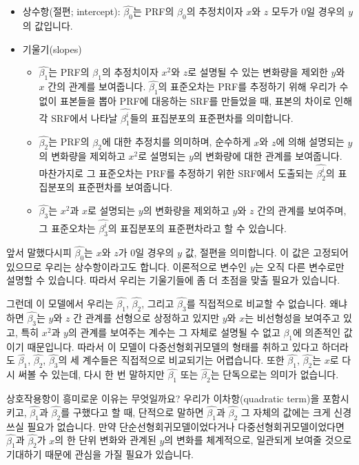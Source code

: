 \documentclass[
]{book}
\begin{document}
\begin{itemize}
\item
  상수항(절편; intercept): \(\hat{\beta_0}\)는 PRF의 \(\beta_0\)의 추정치이자 \(x\)와 \(z\) 모두가 0일 경우의 \(y\)의 값입니다.
\item
  기울기(slopes)

  \begin{itemize}
  \item
    \(\hat{\beta_1}\)는 PRF의 \(\beta_1\)의 추정치이자 \(x^2\)와 \(z\)로 설명될 수 있는 변화량을 제외한 \(y\)와 \(x\) 간의 관계를 보여줍니다. \(\hat{\beta_1}\)의 표준오차는 PRF를 추정하기 위해 우리가 수없이 표본들을 뽑아 PRF에 대응하는 SRF를 만들었을 때, 표본의 차이로 인해 각 SRF에서 나타날 \(\hat{\beta^i_1}\)들의 표집분포의 표준편차를 의미합니다.
  \item
    \(\hat{\beta_2}\)는 PRF의 \(\beta_2\)에 대한 추정치를 의미하며, 순수하게 \(x\)와 \(z\)에 의해 설명되는 \(y\)의 변화량을 제외하고 \(x^2\)로 설명되는 \(y\)의 변화량에 대한 관계를 보여줍니다. 마찬가지로 그 표준오차는 PRF를 추정하기 위한 SRF에서 도출되는 \(\hat{\beta^i_2}\)의 표집분포의 표준편차를 보여줍니다.
  \item
    \(\hat{\beta_3}\)는 \(x^2\)과 \(x\)로 설명되는 \(y\)의 변화량을 제외하고 \(y\)와 \(z\) 간의 관계를 보여주며, 그 표준오차는 \(\hat{\beta^i_3}\)의 표집분포의 표준편차라고 할 수 있습니다.
  \end{itemize}
\end{itemize}

앞서 말했다시피 \(\hat{\beta_0}\)는 \(x\)와 \(z\)가 0일 경우의 \(y\) 값, 절편을 의미합니다. 이 값은 고정되어 있으므로 우리는 상수항이라고도 합니다. 이론적으로 변수인 \(y\)는 오직 다른 변수로만 설명할 수 있습니다. 따라서 우리는 기울기들에 좀 더 초점을 맞출 필요가 있습니다.

그런데 이 모델에서 우리는 \(\hat{\beta_1}\), \(\hat{\beta_2}\), 그리고 \(\hat{\beta_3}\)를 직접적으로 비교할 수 없습니다. 왜냐하면 \(\hat{\beta_3}\)는 \(y\)와 \(z\) 간 관계를 선형으로 상정하고 있지만 \(y\)와 \(x\)는 비선형성을 보여주고 있고, 특히 \(x^2\)과 \(y\)의 관계를 보여주는 계수는 그 자체로 설명될 수 없고 \(\beta_1\)에 의존적인 값이기 때문입니다. 따라서 이 모델이 다중선형회귀모델의 형태를 취하고 있다고 하더라도 \(\hat{\beta_1}\), \(\hat{\beta_2}\), \(\hat{\beta_3}\)의 세 계수들은 직접적으로 비교되기는 어렵습니다. 또한 \(\hat{\beta_1}\), \(\hat{\beta_2}\)는 \(x\)로 다시 써볼 수 있는데, 다시 한 번 말하지만 \(\hat{\beta_1}\) 또는 \(\hat{\beta_2}\)는 단독으로는 의미가 없습니다.

상호작용항이 흥미로운 이유는 무엇일까요? 우리가 이차항(quadratic term)을 포함시키고, \(\hat{\beta_1}\)과 \(\hat{\beta_2}\)를 구했다고 할 때, 단적으로 말하면 \(\hat{\beta_1}\)과 \(\hat{\beta_2}\) 그 자체의 값에는 크게 신경쓰실 필요가 없습니다. 만약 단순선형회귀모델이었다거나 다중선형회귀모델이었다면 \(\hat{\beta_1}\)과 \(\hat{\beta_2}\)가 \(x\)의 한 단위 변화와 관계된 \(y\)의 변화를 체계적으로, 일관되게 보여줄 것으로 기대하기 때문에 관심을 가질 필요가 있습니다.
\end{document}
